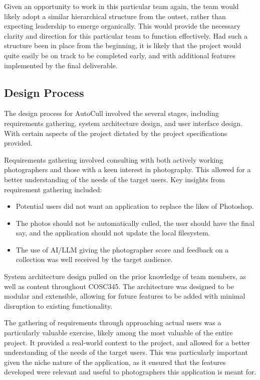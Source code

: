 \documentclass[conference]{IEEEtran}
\begin{document}
Given an opportunity to work in this particular team again, the team would likely adopt a similar hierarchical structure from the outset, rather than expecting leadership to emerge organically. This would provide the necessary clarity and direction for this particular team to function effectively. Had such a structure been in place from the beginning, it is likely that the project would quite easily be on track to be completed early, and with additional features implemented by the final deliverable.

\subsection{Design Process}
The design process for AutoCull involved the several stages, including requirements gathering, system architecture design, and user interface design. With certain aspects of the project dictated by the project specifications provided.

Requirements gathering involved consulting with both actively working photographers and those with a keen interest in photography. This allowed for a better understanding of the needs of the target users. Key insights from requirement gathering included:
\begin{itemize}
    \item Potential users did not want an application to replace the likes of Photoshop.
    \item The photos should not be automatically culled, the user should have the final say, and the application should not update the local filesystem.
    \item The use of AI/LLM giving the photographer score and feedback on a collection was well received by the target audience.
\end{itemize}

System architecture design pulled on the prior knowledge of team members, as well as content throughout COSC345. The architecture was designed to be modular and extensible, allowing for future features to be added with minimal disruption to existing functionality.

The gathering of requirements through approaching actual users was a particularly valuable exercise, likely among the most valuable of the entire project. It provided a real-world context to the project, and allowed for a better understanding of the needs of the target users. This was particularly important given the niche nature of the application, as it ensured that the features developed were relevant and useful to photographers this application is meant for.
\end{document}
